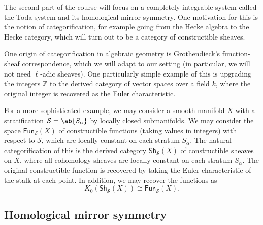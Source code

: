 \documentclass{amsart}
\theoremstyle{definition}
\theoremstyle{remark}
\theoremstyle{plain}
\theoremstyle{definition}
\theoremstyle{remark}
\newcommand{\Z}{\mathbb{Z}}
\newcommand{\mc}[1]{\mathcal{#1}}
\newcommand{\ms}[1]{\mathsf{#1}}
\newcommand{\1}{\mathbf{1}}
\newcommand{\2}{\mathbf{2}}
\newcommand{\3}{\mathbf{3}}
\begin{document}
The second part of the course will focus on a completely integrable system called the Toda system and its homological mirror symmetry. One motivation for this is the notion of categorification, for example going from the Hecke algebra to the Hecke category, which will turn out to be a category of constructible sheaves. 

One origin of categorification in algebraic geometry is Grothendieck's function-sheaf correspondence, which we will adapt to our setting (in particular, we will not need \(\ell\)-adic sheaves). One particularly simple example of this is upgrading the integers \(\Z\) to the derived category of vector spaces over a field \(k\), where the original integer is recovered as the Euler characteristic.

For a more sophisticated example, we may consider a smooth manifold \(X\) with a stratification \(\mc{S} = \ab\{S_{\alpha} \}\) by locally closed submanifolds. We may consider the space \(\ms{Fun}_{\mc{S}}(X)\) of constructible functions (taking values in integers) with respect to \(\mc{S}\), which are locally constant on each stratum \(S_{\alpha}\). The natural categorification of this is the derived category \(\ms{Sh}_{\mc{S}}(X)\)  of constructible sheaves on \(X\), where all cohomology sheaves are locally constant on each stratum \(S_{\alpha}\). The original constructible function is recovered by taking the Euler characteristic of the stalk at each point. In addition, we may recover the functions as
\[ K_0(\ms{Sh}_{\mc{S}}(X)) \cong \ms{Fun}_{\mc{S}} (X). \]

\subsection{Homological mirror symmetry}%
\label{sub:Homological mirror symmetry}
\end{document}
